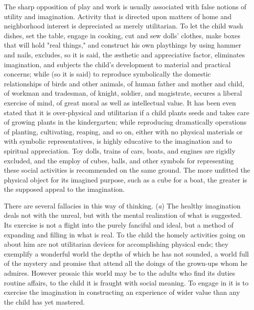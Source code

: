 \documentclass[showtrims,ustradepaper]{memoir}
\begin{document}

The sharp opposition of play and work is usually associated with false
notions of utility and imagination. Activity that is directed upon
matters of home and neighborhood interest is depreciated as merely
utilitarian. To let the child wash dishes, set the table, engage in
cooking, cut and sew dolls' clothes, make boxes that will hold "real
things," and construct his own playthings by using hammer and nails,
excludes, so it is said, the æsthetic and appreciative factor,
eliminates imagination, and subjects the child's development to material
and practical concerns; while (so it is said) to reproduce symbolically
the domestic relationships of birds and other animals, of human father
and mother and child, of workman and tradesman, of knight, soldier, and
magistrate, secures a liberal exercise of mind, of great moral as well
as intellectual value. It has been even stated that it is over-physical
and utilitarian if a child plants seeds and takes care of growing plants
in the kindergarten; while reproducing dramatically operations of
planting, cultivating, reaping, and so on,
either
with no physical materials or with symbolic representatives, is highly
educative to the imagination and to spiritual appreciation. Toy dolls,
trains of cars, boats, and engines are rigidly excluded, and the employ
of cubes, balls, and other symbols for representing these social
activities is recommended on the same ground. The more unfitted the
physical object for its imagined purpose, such as a cube for a boat, the
greater is the supposed appeal to the imagination.


There are several fallacies in this way of thinking. (\emph{a}) The
healthy imagination deals not with the unreal, but with the mental
realization of what is suggested. Its exercise is not a flight into the
purely fanciful and ideal, but a method of expanding and filling in what
is real. To the child the homely activities going on about him are not
utilitarian devices for accomplishing physical ends; they exemplify a
wonderful world the depths of which he has not sounded, a world full of
the mystery and promise that attend all the doings of the grown-ups whom
he admires. However prosaic this world may be to the adults who find its
duties routine affairs, to the child it is fraught with social meaning.
To engage in it is to exercise the imagination in constructing an
experience of wider value than any the child has yet mastered.
\end{document}
